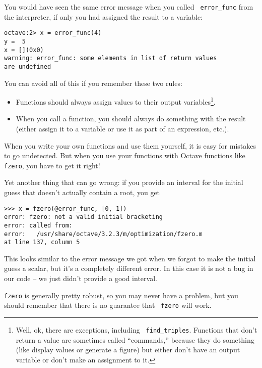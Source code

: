 You would have seen the same error message when you called {\tt
error\_func} from the interpreter, if only you had assigned the result
to a variable:

\begin{verbatim}
octave:2> x = error_func(4)
y =  5
x = [](0x0)
warning: error_func: some elements in list of return values 
are undefined
\end{verbatim}

You can avoid all of this if you remember these two rules:

\begin{itemize}

\item Functions should always assign values to their output
variables\footnote{Well, ok, there are exceptions, including {\tt
find\_triples}. Functions that don't return a value are sometimes
called ``commands,'' because they do something (like display values or
generate a figure) but either don't have an output variable or don't
make an assignment to it.}.

\item When you call a function, you should always do something with
the result (either assign it to a variable or use it as part of an
expression, etc.).

\end{itemize}

When you write your own functions and use them yourself, it is easy
for mistakes to go undetected. But when you use your functions with
Octave functions like {\tt fzero}, you have to get it right!

Yet another thing that can go wrong: if you provide an interval for the
initial guess that doesn't actually contain a root, you get

\begin{verbatim}
>>> x = fzero(@error_func, [0, 1])
error: fzero: not a valid initial bracketing
error: called from:
error:   /usr/share/octave/3.2.3/m/optimization/fzero.m 
at line 137, column 5
\end{verbatim}

This looks similar to the error message we got when we forgot to make the
initial guess a scalar, but it's a completely different error. In this case it
is not a bug in our code -- we just didn't provide a good interval.

{\tt fzero} is generally pretty robust, so you may never have a
problem, but you should remember that there is no guarantee that {\tt
fzero} will work.


